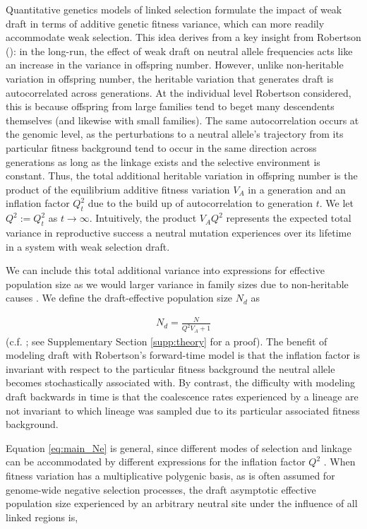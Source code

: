 \documentclass[11pt]{article}
\begin{document}
Quantitative genetics models of linked selection formulate the impact of weak
draft in terms of additive genetic fitness variance, which can more readily
accommodate weak selection. This idea derives from a key insight from Robertson
(\citeyear{Robertson1961-ho}): in the long-run, the effect of weak draft on
neutral allele frequencies acts like an increase in the variance in offspring
number. However, unlike non-heritable variation in offspring number, the
heritable variation that generates draft is autocorrelated across generations.
At the individual level Robertson considered, this is because offspring from
large families tend to beget many descendents themselves (and likewise with
small families). The same autocorrelation occurs at the genomic level, as the
perturbations to a neutral allele's trajectory from its particular fitness
background tend to occur in the same direction across generations as long as
the linkage exists and the selective environment is constant. Thus, the total
additional heritable variation in offspring number is the product of the
equilibrium additive fitness variation $V_A$ in a generation and an inflation
factor $Q_t^2$ due to the build up of autocorrelation to generation $t$. We let
$Q^2 := Q_t^2$ as $t \to \infty$. Intuitively, the product $V_A Q^2$ represents
the expected total variance in reproductive success a neutral mutation
experiences over its lifetime in a system with weak selection draft. 

We can include this total additional variance into expressions for effective
population size as we would larger variance in family sizes due to
non-heritable causes \parencite{Wright1938-tv}. We define the draft-effective
population size $N_d$ as

\begin{align}
    \label{eq:main_Ne}
    N_d = \frac{N}{Q^2 V_A + 1}
\end{align}
%
(c.f. \cite{Robertson1961-ho,Santiago1995-hx}; see Supplementary Section
\ref{supp:theory} for a proof). The benefit of modeling draft with Robertson's
forward-time model is that the inflation factor is invariant with respect to
the particular fitness background the neutral allele becomes stochastically
associated with. By contrast, the difficulty with modeling draft backwards in
time is that the coalescence rates experienced by a lineage are not invariant
to which lineage was sampled due to its particular associated fitness
background.

Equation \eqref{eq:main_Ne} is general, since different modes of selection and
linkage can be accommodated by different expressions for the inflation factor
$Q^2$ \parencite{Santiago1995-hx,Santiago1998-bs}. When fitness variation has a
multiplicative polygenic basis, as is often assumed for genome-wide negative
selection processes, the draft asymptotic effective population size experienced
by an arbitrary neutral site under the influence of all linked regions is,
\end{document}
